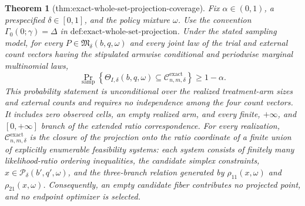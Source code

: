 \documentclass{article}
\newtheorem{theorem}{Theorem}
\begin{document}
\begin{theorem}[thm:exact-whole-set-projection-coverage]\label{thm:exact-whole-set-projection-coverage}
Fix \(\alpha\in(0,1)\), a prespecified \(\delta\in[0,1]\), and the policy mixture \(\omega\). Use the convention \(\Gamma_0(0;\gamma)=\Delta\) in \(\text{def:exact-whole-set-projection}\). Under the stated sampling model, for every \(P\in\mathfrak M_\delta(b,q,\omega)\) and every joint law of the trial and external count vectors having the stipulated armwise conditional and periodwise marginal multinomial laws,
\[
 \Pr_{\mathrm{samp}}\!\left\{
   \Theta_{I,\delta}(b,q,\omega)
   \subseteq \mathcal C_{n,m,\delta}^{\mathrm{exact}}
 \right\}\geq 1-\alpha .
\]
This probability statement is unconditional over the realized treatment-arm sizes and external counts and requires no independence among the four count vectors. It includes zero observed cells, an empty realized arm, and every finite, \(+\infty\), and \([0,+\infty]\) branch of the extended ratio correspondence. For every realization, \(\mathcal C_{n,m,\delta}^{\mathrm{exact}}\) is the closure of the projection onto the ratio coordinate of a finite union of explicitly enumerable feasibility systems: each system consists of finitely many likelihood-ratio ordering inequalities, the candidate simplex constraints, \(x\in\mathcal P_\delta(b',q',\omega)\), and the three-branch relation generated by \(\rho_{11}(x,\omega)\) and \(\rho_{21}(x,\omega)\). Consequently, an empty candidate fiber contributes no projected point, and no endpoint optimizer is selected.
\end{theorem}
\end{document}
